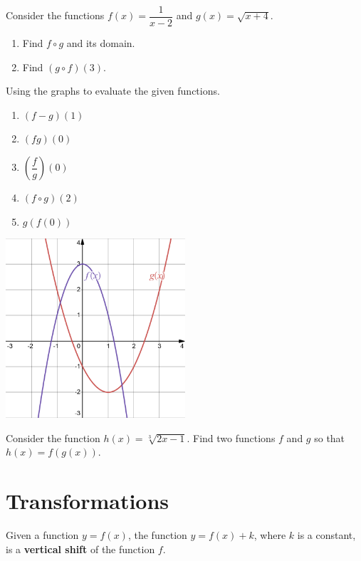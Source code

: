\begin{exercise}
  Consider the functions $f(x)=\dfrac{1}{x-2}$ and $g(x)=\sqrt{x+4}$.

\begin{enumerate}
  \item Find $f\circ g$ and its domain.
  \item Find $(g\circ f)(3)$.
\end{enumerate}
\end{exercise}

\newpage

\begin{exercise}
    Using the graphs to evaluate the given functions.
    \begin{multicols}{2}
      \begin{enumerate}
        \item $(f-g)(1)$
        \item $(fg)(0)$
        \item $\left(\dfrac{f}{g}\right)(0)$
        \item $(f\circ g)(2)$
        \item $g(f(0))$
      \end{enumerate}
      \columnbreak
      \includegraphics[width=0.5\textwidth]{figs/two-quadratics-exr.png}
    \end{multicols}
\end{exercise}

\begin{example}
  Consider the function $h(x)=\sqrt[3]{2x-1}$. Find two functions $f$ and $g$ so that $h(x)=f(g(x))$.
\end{example}
\newpage
\section{Transformations}

\begin{definition}
  Given a function \(y=f(x)\), the function \(y=f(x)+k\), where \(k\) is a constant, is a \textbf{vertical shift} of the function \(f\). 
\end{definition}

